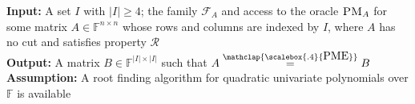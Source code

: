 \documentclass[11pt,letterpaper]{article}
\newcommand{\F}{\mathbb{F}}
\newcommand{\DS}{\stackrel{\mathclap{\scalebox{.5}{\mbox{DS}}}}{=}}
\newcommand{\PME}{\stackrel{\mathclap{\scalebox{.4}{\mbox{PME}}}}{=}}
\newcommand{\prop}{\mathcal{R}}
\newcommand{\PMoracle}[1]{\textsc{PM}_{#1}}
\newcommand{\submatrixfamily}[1]{\mathcal{F}_{#1}}
\begin{document}
{{{%




\begin{algorithm}
\caption{Reconstruction of principal minor equivalent matrix with property $\prop$ and no cut}
\label{algo:reconstruction-with-no-cut-&-Q}
\textbf{Input:} A set $I$ with $|I|\geq 4$; the family $\submatrixfamily{A}$ and access to the oracle $\PMoracle{A}$  for some matrix $A\in\F^{n\times n}$ whose rows and columns are indexed by $I$, where $A$ has no cut and satisfies property $\prop$\\
\textbf{Output:} A matrix $B\in \F^{|I|\times |I|}$ such that $A\PME B$\\
\textbf{Assumption:} A root finding algorithm for quadratic univariate polynomials over $\F$ is available
\begin{algorithmic}[1]


\end{algorithmic}
\end{algorithm}}}}
\end{document}
